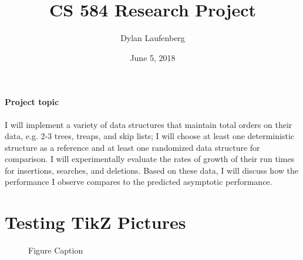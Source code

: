 \documentclass{article}
\title{CS 584 Research Project}
\author{ Dylan Laufenberg }
\date{June 5, 2018}
\begin{document}
\maketitle

\paragraph{Project topic} I will implement a variety of data structures that maintain total orders on their data, e.g. 2-3 trees, treaps, and skip lists; I will choose at least one deterministic structure as a reference and at least one randomized data structure for comparison. I will experimentally evaluate the rates of growth of their run times for insertions, searches, and deletions. Based on these data, I will discuss how the performance I observe compares to the predicted asymptotic performance.

\newpage

\section{Testing TikZ Pictures}

\begin{figure}[h]
    \centering
    \caption{Figure Caption}
\end{figure}
\end{document}

